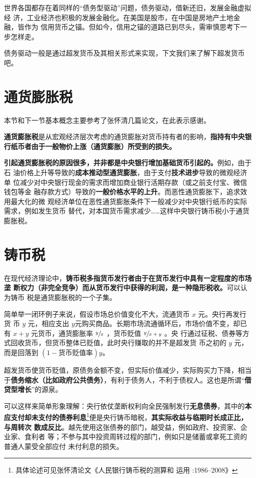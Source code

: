 世界各国都存在着同样的“债务型驱动”问题，债务驱动，借新还旧，发展金融虚拟经
济，工业经济也积极的发展金融化。在美国是股市，在中国是房地产土地金融，皆作为
信用货币之锚。但如今，信用之锚的道路已到尽头，需审慎思考下一步怎样走。

债务驱动一般是通过超发货币及其相关形式来实现，下文我们来了解下超发货币吧。


\section{通货膨胀税}

本节和下一节基本概念主要参考了张怀清几篇论文，在此表示感谢。

\textbf{通货膨胀税}是从宏观经济层次考虑的通货膨胀对货币持有者的影响，\textbf{指持有中央银
  行纸币者由于一般物价上涨（通货膨胀）所受到的损失。}

\textbf{引起通货膨胀税的原因很多，并非都是中央银行增加基础货币引起的。}例如，由于石
油价格上升等导致的\textbf{成本推动型通货膨胀}，由于支付\textbf{技术进步}导致的微观经济单
位减少对中央银行现金的需求而增加商业银行活期存款（或之前支付宝、微信钱包等金
融存款方式）导致的\textbf{一般价格水平的上升}。而恶性通货膨胀下，追求效用最大化的微
观经济单位在恶性通货膨胀条件下一般减少对中央银行纸币的实际需求，例如发生货币
替代，对本国货币需求减少……这样中央银行铸币税小于通货膨胀税。

\section{铸币税}

在现代经济理论中，\textbf{铸币税多指货币发行者由于在货币发行中具有一定程度的市场垄
  断权力（非完全竞争）而从货币发行中获得的利润，是一种隐形税收。}可以认为铸币
税是通货膨胀税的一个子集。

简单举一闭环例子来说，假设市场总价值变化不大，流通货币 $x$ 元。央行再发行货
币 $y$ 元，相应支出 $y$元购买商品。长期市场流通循环后，市场价值不变，却已
有 $x+y$ 元货币，通货膨胀率 $ \sfrac{y}{x}$ ，货币贬值 $\sfrac{y}{x+y}$ 。央
行通过征税、债券等方式回收货币，但货币整体已贬值，此时央行赚取的并不是超发货
币之初的 $y$ 元，而是回落到 $(1 - 货币贬值率)y$。

超发货币使货币贬值，原债务金额不变，但实际价值减少，实际购买力下降，相当
于\textbf{债务缩水（比如政府公共债务）}，有利于债务人，不利于债权人。这也是所谓“\textbf{借
贷型增长}”的源泉。

可以这样来简单形象理解：央行依仗垄断权利向全民强制发行\textbf{无息债券}，其中的\textbf{本
  应支付却未支付的债券利息}\footnote{具体论述可见张怀清论文《人民银行铸币税的测算和
  运用 :1986--2008》}便是央行铸币暗税，\textbf{其实际收益与临期时长成正比，与周转次
  数成反比}。越先使用这张债券的部门，越受益，例如政府、投资家、企业家、食利者
等；不参与其中投资周转过程的部门，例如只是储蓄或拿死工资的普通人蒙受全部应付
未付利息的损失。

